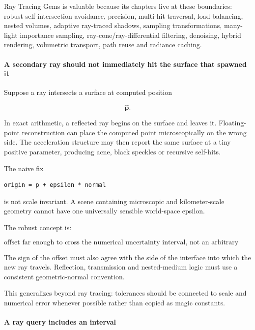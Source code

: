 Ray Tracing Gems is valuable because its chapters live at these boundaries: robust self-intersection avoidance, precision, multi-hit traversal, load balancing, nested volumes, adaptive ray-traced shadows, sampling transformations, many-light importance sampling, ray-cone/ray-differential filtering, denoising, hybrid rendering, volumetric transport, path reuse and radiance caching.

\paragraph{A secondary ray should not immediately hit the surface that spawned it}\label{03-visual-computing-i-ch001-a-secondary-ray-should-not-immediately-hit-the-surface-that-spawned-it}

\hypertarget{03-visual-computing-i-ch001-a-secondary-ray-should-not-immediately-hit-the-surface-that-spawned-it}{}

Suppose a ray intersects a surface at computed position

\[
\widehat{\mathbf p}.
\]

In exact arithmetic, a reflected ray begins on the surface and leaves it. Floating-point reconstruction can place the computed point microscopically on the wrong side. The acceleration structure may then report the same surface at a tiny positive parameter, producing acne, black speckles or recursive self-hits.

The naive fix

\begin{verbatim}
origin = p + epsilon * normal
\end{verbatim}

is not scale invariant. A scene containing microscopic and kilometer-scale geometry cannot have one universally sensible world-space epsilon.

The robust concept is:

\[
\boxed{
\text{offset far enough to cross the numerical uncertainty interval,
not an arbitrary visual distance}
}
\]

The sign of the offset must also agree with the side of the interface into which the new ray travels. Reflection, transmission and nested-medium logic must use a consistent geometric-normal convention.

This generalizes beyond ray tracing: tolerances should be connected to scale and numerical error whenever possible rather than copied as magic constants.

\paragraph{A ray query includes an interval}\label{03-visual-computing-i-ch001-a-ray-query-includes-an-interval}

